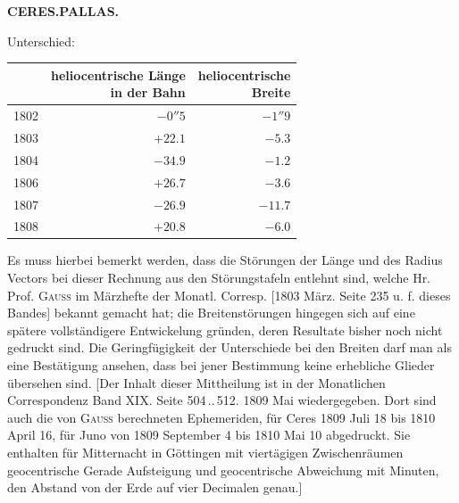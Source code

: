 \clearpage
\endgroup
\clearpage
\begingroup
\pagestyle{empty}
\thispagestyle{empty}
\noindent{}%
%
\parbox[t]{\dimexpr\linewidth-24mm\relax}{\centering\footnotesize\bfseries CERES.\quad PALLAS.\par}%
\makebox[12mm][r]{}\par\nobreak\medskip
\begin{center} Unterschied:
\end{center}


\begin{center}\fontsize{10}{12}\selectfont\setlength{\tabcolsep}{5pt}\renewcommand{\arraystretch}{1.15}\begin{tabular}{crr}  & \shortstack{heliocentrische Länge\\in der Bahn} & \shortstack{heliocentrische\\Breite}\\\hline 1802 & $-0''5$ & $-1''9$\\ 1803 & $+22.1$ & $-5.3$\\ 1804 & $-34.9$ & $-1.2$\\ 1806 & $+26.7$ & $-3.6$\\ 1807 & $-26.9$ & $-11.7$\\ 1808 & $+20.8$ & $-6.0$\\
\end{tabular}\end{center}


\par\noindent Es muss hierbei bemerkt werden, dass die Störungen der Länge und des Radius Vectors bei dieser Rechnung aus den Störungstafeln entlehnt sind, welche Hr. Prof. \textsc{Gauss} im Märzhefte der Monatl. Corresp. [1803 März. Seite 235 u. f. dieses Bandes] bekannt gemacht hat; die Breitenstörungen hingegen sich auf eine spätere vollständigere Entwickelung gründen, deren Resultate bisher noch nicht gedruckt sind. Die Geringfügigkeit der Unterschiede bei den Breiten darf man als eine Bestätigung ansehen, dass bei jener Bestimmung keine erhebliche Glieder übersehen sind. [Der Inhalt dieser Mittheilung ist in der Monatlichen Correspondenz Band XIX. Seite 504\,..\,512. 1809 Mai wiedergegeben. Dort sind auch die von \textsc{Gauss} berechneten Ephemeriden, für Ceres 1809 Juli 18 bis 1810 April 16, für Juno von 1809 September 4 bis 1810 Mai 10 abgedruckt. Sie enthalten für Mitternacht in Göttingen mit viertägigen Zwischenräumen geocentrische Gerade Aufsteigung und geocentrische Abweichung mit Minuten, den Abstand von der Erde auf vier Decimalen genau.]

